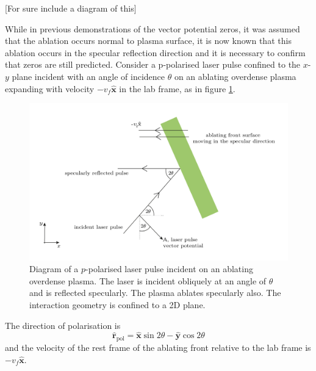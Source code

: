 [For sure include a diagram of this]

While in previous demonstrations of the vector potential zeros, it was assumed that the ablation occurs normal to plasma surface, it is now known that this ablation occurs in the specular reflection direction and it is necessary to confirm that zeros are still predicted. Consider a p-polarised laser pulse confined to the $x$-$y$ plane incident with an angle of incidence $\theta$ on an ablating overdense plasma expanding with velocity $-v_f\hat{\mathbf{x}}$ in the lab frame, as in figure \ref{fig:zvp_ablatingfront}.
\begin{figure}
	\centering
	\includegraphics[width=0.7\linewidth]{figures/zvp/zvp_ablating_front}
	\caption{Diagram of a $p$-polarised laser pulse incident on an ablating overdense plasma. The laser is incident obliquely at an angle of $\theta$ and is reflected specularly. The plasma ablates specularly also. The interaction geometry is confined to a 2D plane.}
	\label{fig:zvp_ablatingfront}
\end{figure}
The direction of polarisation is
\begin{equation}
	\hat{\mathbf{r}}_\mathrm{pol} = \hat{\mathbf{x}}\sin{2\theta} - \hat{\mathbf{y}}\cos{2\theta}
\end{equation}
and the velocity of the rest frame of the ablating front relative to the lab frame is $-v_f\hat{\mathbf{x}}$.

